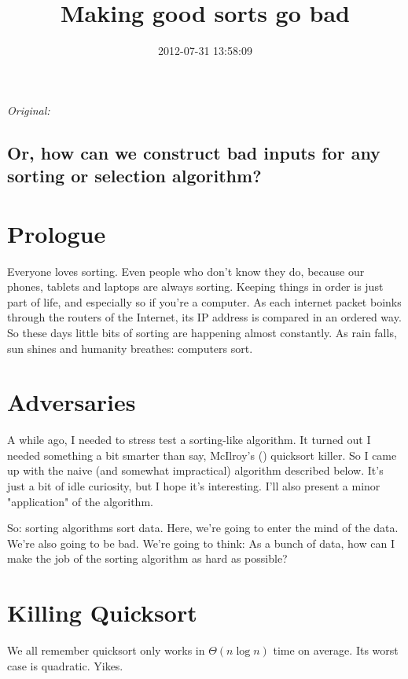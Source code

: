 \documentclass[11pt]{article}
\begin{document}
\title{Making good sorts go bad}
\date{2012-07-31 13:58:09}
\maketitle

\noindent\textit{Original: }\texttt{}\par
\medskip
\subsection{Or, how can we construct bad inputs for any sorting or selection algorithm?}

\section{Prologue}

Everyone loves sorting. Even people who don't know they do, because our phones, tablets and laptops are always sorting. Keeping things in order is just part of life, and especially so if you're a computer. As each internet packet boinks through the routers of the Internet, its IP address is compared in an ordered way. So these days little bits of sorting are happening almost constantly. As rain falls, sun shines and humanity breathes: computers sort.
\section{Adversaries}

A while ago, I needed to stress test a sorting-like algorithm. It turned out I needed something a bit smarter than say, McIlroy's (\texttt{}) quicksort killer. So I came up with the naive (and somewhat impractical) algorithm described below. It's just a bit of idle curiosity, but I hope it's interesting. I'll also present a minor "application" of the algorithm.

So: sorting algorithms sort data. Here, we're going to enter the mind of the data. We're also going to be bad. We're going to think: As a bunch of data, how can I make the job of the sorting algorithm as hard as possible?
\section{Killing Quicksort}

We all remember quicksort only works in $\Theta (n \log n)$ time on average. Its worst case is quadratic. Yikes.
\end{document}

